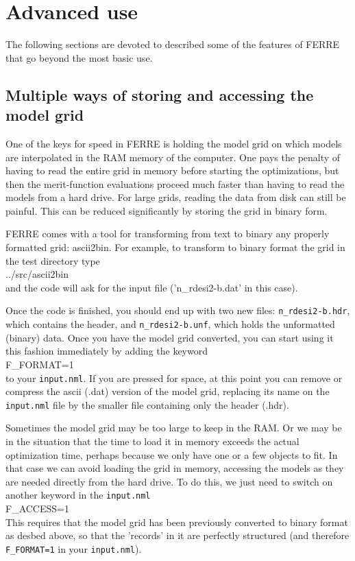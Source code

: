 \documentclass[12pt]{article}
\begin{document}
\section{Advanced use}

The following sections are devoted to described some of the features of FERRE 
that go beyond the most basic use. 

\subsection{Multiple ways of storing and accessing the model grid}

One of the keys for speed in FERRE is holding the model grid on which models
are interpolated in the RAM memory of the computer. One pays the penalty of 
having to read the entire grid in memory before starting the optimizations, 
but then the merit-function evaluations proceed much faster than having to
read the models from a hard drive. For large grids, reading the data from 
disk can still be painful. This can be reduced significantly by storing the
grid in binary form. 

FERRE comes with a tool for transforming from text to
binary any properly formatted grid: ascii2bin. 
For example, to transform to binary format the grid in the test directory type \\
../src/ascii2bin \\
and the code will ask for the input file ('n\_rdesi2-b.dat' in this case). 

Once the code is finished, you should end up with two new files: {\tt n\_rdesi2-b.hdr},
which contains the header, and {\tt n\_rdesi2-b.unf}, which holds the unformatted (binary)
data. Once you have the model grid converted, you can start using it this fashion
immediately by adding the keyword \\
F\_FORMAT=1 \\
to your {\tt input.nml}. If you are pressed for space, at this point you can 
remove or compress the ascii (.dat) version of the model grid, replacing its name 
on the {\tt input.nml} file by the smaller file containing only the header (.hdr).

Sometimes the model grid may be too large to keep in the RAM. Or we may be
in the situation that the time to load it in memory exceeds the actual 
optimization time, perhaps because we only have one or a few objects to fit. In that
case we can avoid loading the grid in memory, accessing the models as they are
needed directly from the hard drive. To do this, we just need to switch on another
keyword in the {\tt input.nml} \\
F\_ACCESS=1\\
This requires that the model grid has been previously converted to binary format as desbed above, 
so that the 'records' in it are perfectly structured (and therefore {\tt F\_FORMAT=1} 
in your {\tt input.nml}).
\end{document}
